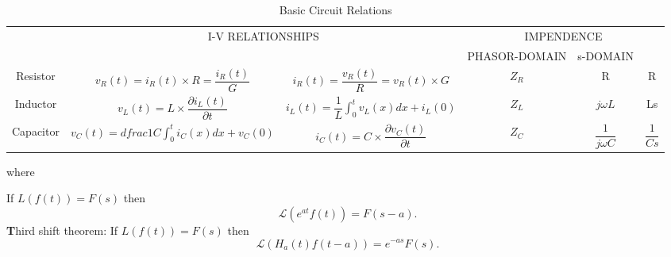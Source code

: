  \begin{table}[h]
	
	\begin{center}
			\begin{tabular}{cccccc}
				\toprule 
				\multirow{1}{*}{}	& \multicolumn{2}{c}{\multirow{ 2}{*}{I-V RELATIONSHIPS}} &	\multicolumn{3}{c}{IMPENDENCE}  \\ \cline{4-6}
				& &	&  PHASOR-DOMAIN & s-DOMAIN & \\ \hline
				Resistor	& $v_R(t)=i_R(t) \times R=\dfrac{i_R(t)}{G}$& $i_R(t)=\dfrac{v_R(t)}{R}=v_R(t) \times G$& $ Z_R $ & R & R\\ \hline
				Inductor	& $v_L(t)=L\times \dfrac{ \partial i_L(t)}{\partial t} $& $i_L(t)=\dfrac{1}{L} \int_{0}^{t} v_L(x)dx+ i_L(0)$& $ Z_L $ &$ j\omega L$ & Ls\\ \hline
				Capacitor	& $v_C(t)=dfrac{1}{C}\int_{0}^{t} i_C(x)dx+ v_C(0)$& $i_C(t)=C\times \dfrac{\partial v_C(t)}{\partial t} $& $ Z_C $ & $ \dfrac{1}{j\omega C} $& $\dfrac{1}{Cs}$\\ 
				\bottomrule
			\end{tabular}
		\caption{Basic Circuit Relations}
	\end{center}
\end{table}


where 

 If $L(f(t))=F(s)$ then
$$ {\mathcal L}\left(e^{at}f(t)\right)=F(s-a).$$
{\textbf Third shift theorem:} If ${L}(f(t))=F(s)$ then
$$ {\mathcal L}\left(H_a(t)f(t-a)\right)=e^{-as}F(s).$$